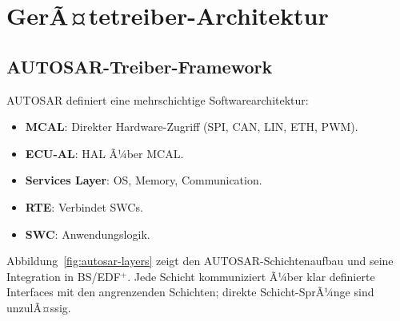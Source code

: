 ﻿\documentclass[a4paper,12pt]{scrreprt}
\theoremstyle{definition}
\begin{document}
	\chapter{GerÃ¤tetreiber-Architektur}
	
	\section{AUTOSAR-Treiber-Framework}

	AUTOSAR \cite{AUTOSAR2023} definiert eine mehrschichtige Softwarearchitektur:
	\begin{itemize}
		\item \textbf{MCAL}: Direkter Hardware-Zugriff (SPI, CAN, LIN, ETH, PWM).
		\item \textbf{ECU-AL}: HAL Ã¼ber MCAL.
		\item \textbf{Services Layer}: OS, Memory, Communication.
		\item \textbf{RTE}: Verbindet SWCs.
		\item \textbf{SWC}: Anwendungslogik.
	\end{itemize}

	Abbildung~\ref{fig:autosar-layers} zeigt den AUTOSAR-Schichtenaufbau und
	seine Integration in BS/EDF$^+$. Jede Schicht kommuniziert Ã¼ber klar
	definierte Interfaces mit den angrenzenden Schichten; direkte Schicht-SprÃ¼nge
	sind unzulÃ¤ssig.
\end{document}

